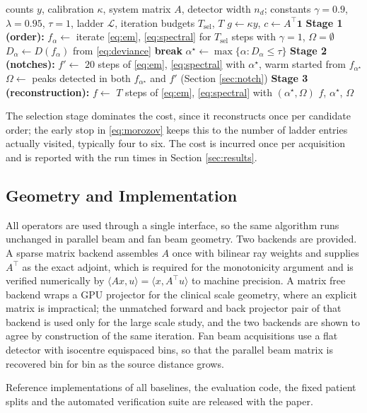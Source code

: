 \begin{algorithm}[t]
\caption{A-FONF reconstruction}
\label{alg:afonf}
\begin{algorithmic}[1]
\REQUIRE counts $y$, calibration $\kappa$, system matrix $A$, detector width
$n_{d}$; constants $\gamma=0.9$, $\lambda=0.95$, $\tau=1$, ladder
$\mathcal{L}$, iteration budgets $T_{\mathrm{sel}}$, $T$
\STATE $g\leftarrow\kappa y$, \; $c\leftarrow A^{\!\top}\mathbf{1}$
\STATE \textbf{Stage 1 (order):}
  \STATE $f_{\alpha}\leftarrow$ iterate \eqref{eq:em}, \eqref{eq:spectral}
         for $T_{\mathrm{sel}}$ steps with $\gamma=1$, $\Omega=\emptyset$
  \STATE $D_{\alpha}\leftarrow D(f_{\alpha})$ from \eqref{eq:deviance}
   \STATE \textbf{break} \ENDIF
\ENDFOR
\STATE $\alpha^{\star}\leftarrow\max\{\alpha:D_{\alpha}\le\tau\}$
\STATE \textbf{Stage 2 (notches):}
\STATE $f'\leftarrow$ $20$ steps of \eqref{eq:em}, \eqref{eq:spectral} with
       $\alpha^{\star}$, warm started from $f_{\alpha^{\star}}$
\STATE $\Omega\leftarrow$ peaks detected in both $f_{\alpha^{\star}}$ and
       $f'$ (Section \ref{sec:notch})
\STATE \textbf{Stage 3 (reconstruction):}
\STATE $f\leftarrow$ $T$ steps of \eqref{eq:em}, \eqref{eq:spectral} with
       $(\alpha^{\star},\Omega)$
\RETURN $f$, $\alpha^{\star}$, $\Omega$
\end{algorithmic}
\end{algorithm}

The selection stage dominates the cost, since it reconstructs once per
candidate order; the early stop in \eqref{eq:morozov} keeps this to the
number of ladder entries actually visited, typically four to six. The cost is
incurred once per acquisition and is reported with the run times in
Section \ref{sec:results}.

\subsection{Geometry and Implementation}
\label{sec:implementation}

All operators are used through a single interface, so the same algorithm runs
unchanged in parallel beam and fan beam geometry. Two backends are provided.
A sparse matrix backend assembles $A$ once with bilinear ray weights and
supplies $A^{\!\top}$ as the exact adjoint, which is required for the
monotonicity argument and is verified numerically by
$\langle Ax,u\rangle=\langle x,A^{\!\top}u\rangle$ to machine precision. A
matrix free backend wraps a GPU projector for the clinical scale geometry,
where an explicit matrix is impractical; the unmatched forward and back
projector pair of that backend is used only for the large scale study, and
the two backends are shown to agree by construction of the same iteration.
Fan beam acquisitions use a flat detector with isocentre equispaced bins, so
that the parallel beam matrix is recovered bin for bin as the source distance
grows.

Reference implementations of all baselines, the evaluation code, the fixed
patient splits and the automated verification suite are released with the
paper.
